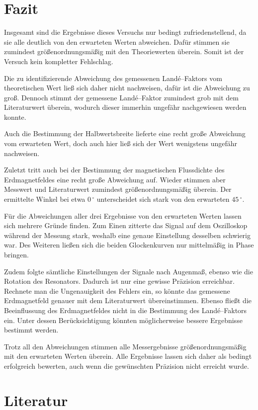 \documentclass[12pt,a4paper]{scrartcl}
\numberwithin{equation}{section} %
\begin{document}
\clearpage
\hypertarget{fazit}{\section{Fazit}\label{fazit}}
Insgesamt sind die Ergebnisse dieses Versuchs nur bedingt zufriedenstellend, da sie alle deutlich von den erwarteten Werten abweichen. Dafür stimmen sie zumindest größenordnungsmäßig mit den Theoriewerten überein. Somit ist der Versuch kein kompletter Fehlschlag.

Die zu identifizierende Abweichung des gemessenen Landé--Faktors vom theoretischen Wert ließ sich daher nicht nachweisen, dafür ist die Abweichung zu groß. Dennoch stimmt der gemessene Landé--Faktor zumindest grob mit dem Literaturwert überein, wodurch dieser immerhin ungefähr nachgewiesen werden konnte.

Auch die Bestimmung der Halbwertsbreite lieferte eine recht große Abweichung vom erwarteten Wert, doch auch hier ließ sich der Wert wenigstens ungefähr nachweisen.

Zuletzt tritt auch bei der Bestimmung der magnetischen Flussdichte des Erdmagnetfeldes eine recht große Abweichung auf. Wieder stimmen aber Messwert und Literaturwert zumindest größenordnungsmäßig überein. Der ermittelte Winkel bei etwa $0\,^\circ$ unterscheidet sich stark von den erwarteten $45\,^\circ $.

Für die Abweichungen aller drei Ergebnisse von den erwarteten Werten lassen sich mehrere Gründe finden. Zum Einen zitterte das Signal auf dem Oszilloskop während der Messung stark, weshalb eine genaue Einstellung desselben schwierig war. Des Weiteren ließen sich die beiden Glockenkurven nur mittelmäßig in Phase bringen.

Zudem folgte sämtliche Einstellungen der Signale nach Augenmaß, ebenso wie die Rotation des Resonators. Dadurch ist nur eine gewisse Präzision erreichbar. Rechnete man die Ungenauigkeit des Fehlers ein, so könnte das gemessene Erdmagnetfeld genauer mit dem Literaturwert übereinstimmen. Ebenso fließt die Beeinflussung des Erdmagnetfeldes nicht in die Bestimmung des Landé--Faktors ein. Unter dessen Berücksichtigung könnten möglicherweise bessere Ergebnisse bestimmt werden.

Trotz all den Abweichungen stimmen alle Messergebnisse größenordnungsmäßig mit den erwarteten Werten überein. Alle Ergebnisse lassen sich daher als bedingt erfolgreich bewerten, auch wenn die gewünschten Präzision nicht erreicht wurde.

\clearpage
\hypertarget{literatur}{%
\section{Literatur}\label{literatur}}
\renewcommand{\section}[2]{}
\end{document}
